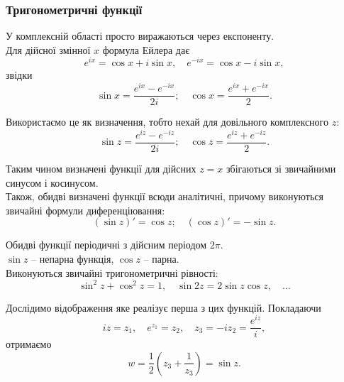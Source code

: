 \subsubsection{Тригонометричні функції}

У комплексній області просто виражаються через експоненту. \\

Для дійсної змінної $x$ формула Ейлера дає
\begin{equation}
	\label{eq:3.4.1}
	e^{i x} = \cos x + i \sin x, \quad e^{-i x} = \cos x - i \sin x,
\end{equation}
звідки
\begin{equation}
	\label{eq:3.4.2}
	\sin x = \dfrac{e^{i x} - e^{-i x}}{2i}; \quad \cos x = \dfrac{e^{i x} + e^{-i x}}{2}.
\end{equation}

Використаємо це як визначення, тобто нехай для довільного комплексного $z$:
\begin{equation}
	\label{eq:3.4.3}
	\sin z = \dfrac{e^{i z} - e^{-i z}}{2i}; \quad \cos z = \dfrac{e^{i z} + e^{-i z}}{2}.
\end{equation}

Таким чином визначені функції для дійсних $z = x$ збігаються зі звичайними синусом і косинусом. \\

Також, обидві визначені функції всюди аналітичні, причому виконуються звичайні формули диференціювання:
\begin{equation}
	\label{eq:3.4.4}
	(\sin z)' = \cos z; \quad (\cos z)' = - \sin z.
\end{equation}

Обидві функції періодичні з дійсним періодом $2 \pi$. \\

$\sin z$ -- непарна функція, $\cos z$ -- парна. \\

Виконуються звичайні тригонометричні рівності:
\begin{equation}
	\label{eq:3.4.5}
	\sin^2 z + \cos^2 z = 1, \quad \sin 2z = 2 \sin z \cos z, \quad \ldots
\end{equation}

Дослідимо відображення яке реалізує перша з цих функцій. Покладаючи
\begin{equation}
	\label{eq:3.4.6}
	iz = z_1, \quad e^{z_1} = z_2, \quad z_3 = -i z_2 = \dfrac{e^{i z}}{i},
\end{equation}
отримаємо
\begin{equation}
	\label{eq:3.4.7}
	w = \dfrac 12 \left( z_3 + \dfrac{1}{z_3} \right) = \sin z.
\end{equation}

